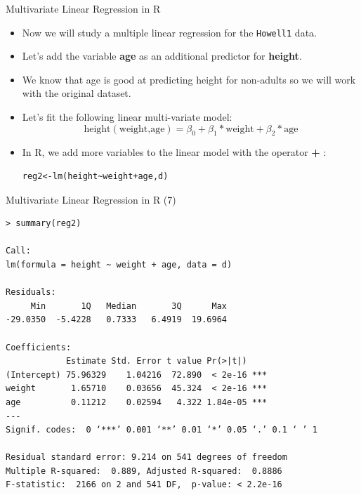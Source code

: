\documentclass[handout]{beamer}
\begin{document}
\begin{frame}[fragile]{Multivariate Linear Regression in R}
\scriptsize{
\begin{itemize}
 \item  Now we will study a multiple linear regression for the \verb+Howell1+ data.
 \item Let's add the variable \textbf{age} as an additional predictor for \textbf{height}.
 \item We know that age is good at predicting height for non-adults so we will work with the original dataset.
 \item  Let's fit the following linear multi-variate model:
 \begin{displaymath}
 \text{height}(\text{weight,age})=\beta_{0}+\beta_{1}*\text{weight}+\beta_{2}*\text{age}
 \end{displaymath}
 \item In R, we add more variables to the linear model with the operator \textbf{+} :
\begin{verbatim}
reg2<-lm(height~weight+age,d)
\end{verbatim}



 
 \end{itemize}
 

} 
\end{frame}


\begin{frame}[fragile]{Multivariate Linear Regression in R (7)}
\scriptsize{

\begin{verbatim}
> summary(reg2)

Call:
lm(formula = height ~ weight + age, data = d)

Residuals:
     Min       1Q   Median       3Q      Max 
-29.0350  -5.4228   0.7333   6.4919  19.6964 

Coefficients:
            Estimate Std. Error t value Pr(>|t|)    
(Intercept) 75.96329    1.04216  72.890  < 2e-16 ***
weight       1.65710    0.03656  45.324  < 2e-16 ***
age          0.11212    0.02594   4.322 1.84e-05 ***
---
Signif. codes:  0 ‘***’ 0.001 ‘**’ 0.01 ‘*’ 0.05 ‘.’ 0.1 ‘ ’ 1

Residual standard error: 9.214 on 541 degrees of freedom
Multiple R-squared:  0.889, Adjusted R-squared:  0.8886 
F-statistic:  2166 on 2 and 541 DF,  p-value: < 2.2e-16

\end{verbatim}


 

} 
\end{frame}
\end{document}

